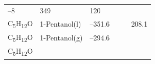 \documentclass[
  9pt,
]{extbook}
\theoremstyle{definition}
\theoremstyle{definition}
\theoremstyle{definition}
\theoremstyle{remark}
\begin{document}
\begin{longtable}[]{@{}llllll@{}}
\begin{minipage}[t]{0.15\columnwidth}
--8\strut
\end{minipage} & \begin{minipage}[t]{0.14\columnwidth}\raggedright
349\strut
\end{minipage} & \begin{minipage}[t]{0.14\columnwidth}\raggedright
120\strut
\end{minipage}\tabularnewline
\begin{minipage}[t]{0.07\columnwidth}\raggedright
C\textsubscript{5}H\textsubscript{12}O\strut
\end{minipage} & \begin{minipage}[t]{0.17\columnwidth}\raggedright
1-Pentanol(l)\strut
\end{minipage} & \begin{minipage}[t]{0.15\columnwidth}\raggedright
--351.6\strut
\end{minipage} & \begin{minipage}[t]{0.15\columnwidth}\raggedright
\strut
\end{minipage} & \begin{minipage}[t]{0.14\columnwidth}\raggedright
\strut
\end{minipage} & \begin{minipage}[t]{0.14\columnwidth}\raggedright
208.1\strut
\end{minipage}\tabularnewline
\begin{minipage}[t]{0.07\columnwidth}\raggedright
C\textsubscript{5}H\textsubscript{12}O\strut
\end{minipage} & \begin{minipage}[t]{0.17\columnwidth}\raggedright
1-Pentanol(g)\strut
\end{minipage} & \begin{minipage}[t]{0.15\columnwidth}\raggedright
--294.6\strut
\end{minipage} & \begin{minipage}[t]{0.15\columnwidth}\raggedright
\strut
\end{minipage} & \begin{minipage}[t]{0.14\columnwidth}\raggedright
\strut
\end{minipage} & \begin{minipage}[t]{0.14\columnwidth}\raggedright
\strut
\end{minipage}\tabularnewline
\begin{minipage}[t]{0.07\columnwidth}\raggedright
C\textsubscript{5}H\textsubscript{12}O\strut
\end{minipage} & \begin{minipage}[t]{0.17\columnwidth}\raggedright

\end{minipage}
\end{longtable}
\end{document}
